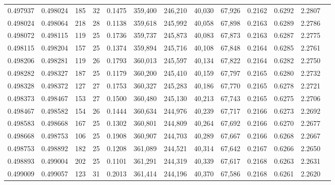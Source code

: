 \begin{tabular}{rrrrrrrrrrrrr}
0.497937 & 0.498024 & 185 &  32 &                                     0.1475 & 359,400 & 246,210 &  40,030 &  67,926 & 0.2162 & 0.6292 & 2.2807 \\
0.498024 & 0.498064 & 218 &  28 &                                     0.1138 & 359,618 & 245,992 &  40,058 &  67,898 & 0.2163 & 0.6289 & 2.2786 \\
0.498072 & 0.498115 & 119 &  25 &                                     0.1736 & 359,737 & 245,873 &  40,083 &  67,873 & 0.2163 & 0.6287 & 2.2775 \\
0.498115 & 0.498204 & 157 &  25 &                                     0.1374 & 359,894 & 245,716 &  40,108 &  67,848 & 0.2164 & 0.6285 & 2.2761 \\
0.498206 & 0.498281 & 119 &  26 &                                     0.1793 & 360,013 & 245,597 &  40,134 &  67,822 & 0.2164 & 0.6282 & 2.2750 \\
0.498282 & 0.498327 & 187 &  25 &                                     0.1179 & 360,200 & 245,410 &  40,159 &  67,797 & 0.2165 & 0.6280 & 2.2732 \\
0.498328 & 0.498372 & 127 &  27 &                                     0.1753 & 360,327 & 245,283 &  40,186 &  67,770 & 0.2165 & 0.6278 & 2.2721 \\
0.498373 & 0.498467 & 153 &  27 &                                     0.1500 & 360,480 & 245,130 &  40,213 &  67,743 & 0.2165 & 0.6275 & 2.2706 \\
0.498467 & 0.498582 & 154 &  26 &                                     0.1444 & 360,634 & 244,976 &  40,239 &  67,717 & 0.2166 & 0.6273 & 2.2692 \\
0.498583 & 0.498668 & 167 &  25 &                                     0.1302 & 360,801 & 244,809 &  40,264 &  67,692 & 0.2166 & 0.6270 & 2.2677 \\
0.498668 & 0.498753 & 106 &  25 &                                     0.1908 & 360,907 & 244,703 &  40,289 &  67,667 & 0.2166 & 0.6268 & 2.2667 \\
0.498753 & 0.498892 & 182 &  25 &                                     0.1208 & 361,089 & 244,521 &  40,314 &  67,642 & 0.2167 & 0.6266 & 2.2650 \\
0.498893 & 0.499004 & 202 &  25 &                                     0.1101 & 361,291 & 244,319 &  40,339 &  67,617 & 0.2168 & 0.6263 & 2.2631 \\
0.499009 & 0.499057 & 123 &  31 &                                     0.2013 & 361,414 & 244,196 &  40,370 &  67,586 & 0.2168 & 0.6261 & 2.2620 \\

\end{tabular}
